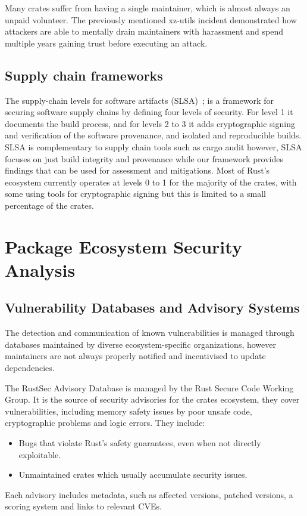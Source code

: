 Many crates suffer from having a single maintainer, which is almost always an unpaid volunteer. The previously mentioned xz-utils incident demonstrated how attackers are able to mentally drain maintainers with harassment and spend multiple years gaining trust before executing an attack.

\subsection{Supply chain frameworks}\label{sect:supply-chain-frameworks}

The supply-chain levels for software artifacts (SLSA)~\cite{slsa2023}; is a framework for securing software supply chains by defining four levels of security. For level 1 it documents the build process, and for levels 2 to 3 it adds cryptographic signing and verification of the software provenance, and isolated and reproducible builds. SLSA is complementary to supply chain tools such as cargo audit however, SLSA focuses on just build integrity and provenance while our framework provides findings that can be used for assessment and mitigations.
Most of Rust's ecosystem currently operates at levels 0 to 1 for the majority of the crates, with some using tools for cryptographic signing but this is limited to a small percentage of the crates.

\section{Package Ecosystem Security Analysis}\label{sect:ecosystem-analysis}

\subsection{Vulnerability Databases and Advisory Systems}\label{sect:vulnerability-databases}

The detection and communication of known vulnerabilities is managed through databases maintained by diverse ecosystem-specific organizations, however maintainers are not always properly notified and incentivised to update dependencies.

The RustSec Advisory Database is managed by the Rust Secure Code Working Group. It is the source of security advisories for the crates ecosystem, they cover vulnerabilities, including memory safety issues by poor unsafe code, cryptographic problems and logic errors. They include:
\begin{itemize}
	\item Bugs that violate Rust's safety guarantees, even when not directly exploitable.
	\item Unmaintained crates which usually accumulate security issues.
\end{itemize}
Each advisory includes metadata, such as affected versions, patched versions, a scoring system and links to relevant CVEs.

